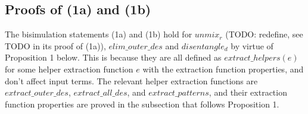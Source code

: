 \documentclass[11pt]{article} %
\begin{document}


\subsection{Proofs of (1a) and (1b)}

The bisimulation statements (1a) and (1b) hold for $unmix_r$ (TODO: redefine, see TODO in its proof of (1a)), $elim\_outer\_des$ and $disentangle_d$ by virtue of Proposition 1 below. This is because they are all defined as $extract\_helpers(e)$ for some helper extraction function $e$ with the extraction function properties, and don't affect input terms. The relevant helper extraction functions are $extract\_outer\_des$, $extract\_all\_des$, and $extract\_patterns$, and their extraction function properties are proved in the subsection that follows Proposition 1.
\end{document}
